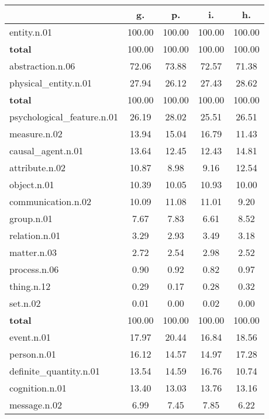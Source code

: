 \begin{table}[h!]
\begin{center}
\begin{tabular}{| l || c | c | c | c |}\hline
 & {\bf g.} & {\bf p.} & {\bf i.} & {\bf h.} \\\hline\hline
entity.n.01 & 100.00  & 100.00  & 100.00  & 100.00 \\\hline\hline
{{\bf total}} & 100.00  & 100.00  & 100.00  & 100.00 \\\hline\hline\hline
abstraction.n.06 & 72.06  & 73.88  & 72.57  & 71.38 \\\hline
physical\_entity.n.01 & 27.94  & 26.12  & 27.43  & 28.62 \\\hline\hline
{{\bf total}} & 100.00  & 100.00  & 100.00  & 100.00 \\\hline\hline\hline
psychological\_feature.n.01 & 26.19  & 28.02  & 25.51  & 26.51 \\\hline
measure.n.02 & 13.94  & 15.04  & 16.79  & 11.43 \\\hline
causal\_agent.n.01 & 13.64  & 12.45  & 12.43  & 14.81 \\\hline
attribute.n.02 & 10.87  & 8.98  & 9.16  & 12.54 \\\hline
object.n.01 & 10.39  & 10.05  & 10.93  & 10.00 \\\hline
communication.n.02 & 10.09  & 11.08  & 11.01  & 9.20 \\\hline
group.n.01 & 7.67  & 7.83  & 6.61  & 8.52 \\\hline
relation.n.01 & 3.29  & 2.93  & 3.49  & 3.18 \\\hline
matter.n.03 & 2.72  & 2.54  & 2.98  & 2.52 \\\hline
process.n.06 & 0.90  & 0.92  & 0.82  & 0.97 \\\hline
thing.n.12 & 0.29  & 0.17  & 0.28  & 0.32 \\\hline
set.n.02 & 0.01  & 0.00  & 0.02  & 0.00 \\\hline\hline
{{\bf total}} & 100.00  & 100.00  & 100.00  & 100.00 \\\hline\hline\hline
event.n.01 & 17.97  & 20.44  & 16.84  & 18.56 \\\hline
person.n.01 & 16.12  & 14.57  & 14.97  & 17.28 \\\hline
definite\_quantity.n.01 & 13.54  & 14.59  & 16.76  & 10.74 \\\hline
cognition.n.01 & 13.40  & 13.03  & 13.76  & 13.16 \\\hline
message.n.02 & 6.99  & 7.45  & 7.85  & 6.22 \\\hline

\end{tabular}
\end{center}
\end{table}
